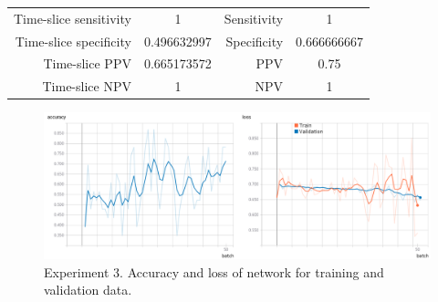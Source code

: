 \documentclass[preprint,12pt]{elsarticle}
\begin{document}
\begin{table}
{\begin{tabular}{ | c | c | c | c | c | c | c | c | }
		\multicolumn{2}{|r|}{Time-slice sensitivity} & 
		\multicolumn{2}{c|}{ 1 } &
		\multicolumn{2}{|r|}{Sensitivity} & 
		\multicolumn{2}{c|}{ 1 } \\ 
		
		\multicolumn{2}{|r|}{Time-slice specificity} & 
		\multicolumn{2}{c|}{ 0.496632997 } &
		\multicolumn{2}{|r|}{Specificity} & 
		\multicolumn{2}{c|}{ 0.666666667 } \\ 
		
		\multicolumn{2}{|r|}{Time-slice PPV} & 
		\multicolumn{2}{c|}{ 0.665173572 } &
		\multicolumn{2}{|r|}{PPV} & 
		\multicolumn{2}{c|}{ 0.75 } \\ 
		
		\multicolumn{2}{|r|}{Time-slice NPV} & 
		\multicolumn{2}{c|}{ 1 } &
		\multicolumn{2}{|r|}{NPV} & 
		\multicolumn{2}{c|}{ 1 } \\ \hline
	\end{tabular}
}
\label{table:tests_3}
\end{table}
\begin{figure}
\includegraphics[width=\linewidth]{images/tests_3}
\caption{Experiment 3. Accuracy and loss of network for training and validation data.}
\label{fig:tests_3}
\end{figure}
\end{document}
